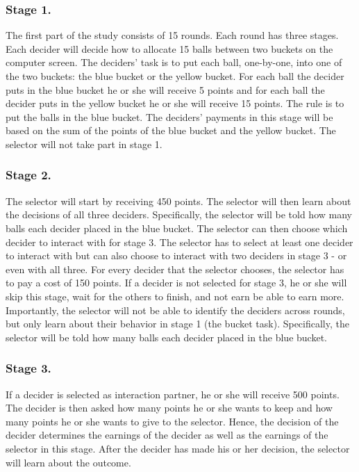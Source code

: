 \documentclass[
  man]{apa6}
\begin{document}
\hypertarget{stage-1.}{%
\subsubsection{Stage 1.}\label{stage-1.}}

The first part of the study consists of 15 rounds. Each round has three stages. Each decider will decide how to allocate 15 balls between two buckets on the computer screen. The deciders' task is to put each ball, one-by-one, into one of the two buckets: the blue bucket or the yellow bucket. For each ball the decider puts in the blue bucket he or she will receive 5 points and for each ball the decider puts in the yellow bucket he or she will receive 15 points. The rule is to put the balls in the blue bucket. The deciders' payments in this stage will be based on the sum of the points of the blue bucket and the yellow bucket. The selector will not take part in stage 1.

\hypertarget{stage-2.}{%
\subsubsection{Stage 2.}\label{stage-2.}}

The selector will start by receiving 450 points. The selector will then learn about the decisions of all three deciders. Specifically, the selector will be told how many balls each decider placed in the blue bucket. The selector can then choose which decider to interact with for stage 3. The selector has to select at least one decider to interact with but can also choose to interact with two deciders in stage 3 - or even with all three. For every decider that the selector chooses, the selector has to pay a cost of 150 points. If a decider is not selected for stage 3, he or she will skip this stage, wait for the others to finish, and not earn be able to earn more. Importantly, the selector will not be able to identify the deciders across rounds, but only learn about their behavior in stage 1 (the bucket task). Specifically, the selector will be told how many balls each decider placed in the blue bucket.

\hypertarget{stage-3.}{%
\subsubsection{Stage 3.}\label{stage-3.}}

If a decider is selected as interaction partner, he or she will receive 500 points. The decider is then asked how many points he or she wants to keep and how many points he or she wants to give to the selector. Hence, the decision of the decider determines the earnings of the decider as well as the earnings of the selector in this stage. After the decider has made his or her decision, the selector will learn about the outcome.
\end{document}
